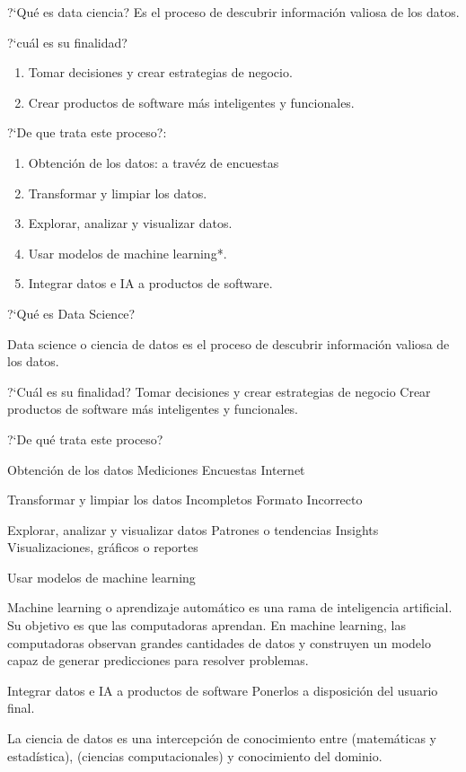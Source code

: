 ?`Qu\'e es data ciencia?
Es el proceso de descubrir informaci\'on valiosa de los datos.

?`cu\'al es su finalidad?

\begin{enumerate}
	\item Tomar decisiones y crear estrategias de negocio. 
	\item Crear productos de software m\'as inteligentes y funcionales.
\end{enumerate}

?`De que trata este proceso?: 
\begin{enumerate}
	\item Obtenci\'on de los datos: a trav\'ez de encuestas
	\item Transformar y limpiar los datos.
	\item Explorar, analizar y visualizar datos.
	\item Usar modelos de machine learning*.
	\item Integrar datos e IA a productos de software.
\end{enumerate}




?`Qu\'e es Data Science?

Data science o ciencia de datos es el proceso de descubrir informaci\'on valiosa de los datos.

?`Cu\'al es su finalidad?
Tomar decisiones y crear estrategias de negocio
Crear productos de software m\'as inteligentes y funcionales.

?`De qu\'e trata este proceso?

Obtenci\'on de los datos
Mediciones
Encuestas
Internet

Transformar y limpiar los datos
Incompletos
Formato Incorrecto

Explorar, analizar y visualizar datos
Patrones o tendencias
Insights
Visualizaciones, gr\'aficos o reportes

Usar modelos de machine learning

Machine learning o aprendizaje autom\'atico es una rama de inteligencia artificial. Su objetivo es que las computadoras aprendan. En machine learning, las computadoras observan grandes cantidades de datos y construyen un modelo capaz de generar predicciones para resolver problemas.

Integrar datos e IA a productos de software
Ponerlos a disposici\'on del usuario final.


La ciencia de datos es una intercepci\'on de conocimiento entre (matem\'aticas y estad\'istica), (ciencias computacionales)  y conocimiento del dominio. 

